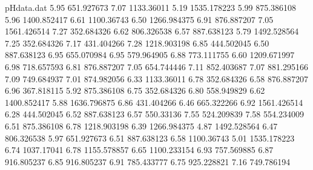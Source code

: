 \begin{filecontents}{pHdata.dat}
5.95	651.927673
7.07	1133.36011
5.19	1535.178223
5.99	875.386108
5.96	1400.852417
6.61	1100.36743
6.50	1266.984375
6.91	876.887207
7.05	1561.426514
7.27	352.684326
6.62	806.326538
6.57	887.638123
5.79	1492.528564
7.25	352.684326
7.17	431.404266
7.28	1218.903198
6.85	444.502045
6.50	887.638123
6.95	655.070984
6.95	579.964905
6.88	773.111755
6.60	1209.671997
6.98	718.657593
6.81	876.887207
7.05	654.744446
7.11	852.403687
7.07	881.295166
7.09	749.684937
7.01	874.982056
6.33	1133.36011
6.78	352.684326
6.58	876.887207
6.96	367.818115
5.92	875.386108
6.75	352.684326
6.80	558.949829
6.62	1400.852417
5.88	1636.796875
6.86	431.404266
6.46	665.322266
6.92	1561.426514
6.28	444.502045
6.52	887.638123
6.57	550.33136
7.55	524.209839
7.58	554.234009
6.51	875.386108
6.78	1218.903198
6.39	1266.984375
4.87	1492.528564
6.47	806.326538
5.97	651.927673
6.51	887.638123
6.58	1100.36743
5.01	1535.178223
6.74	1037.17041
6.78	1155.578857
6.65	1100.233154
6.93	757.569885
6.87	916.805237
6.85	916.805237
6.91	785.433777
6.75	925.228821
7.16	749.786194
\end{filecontents}
